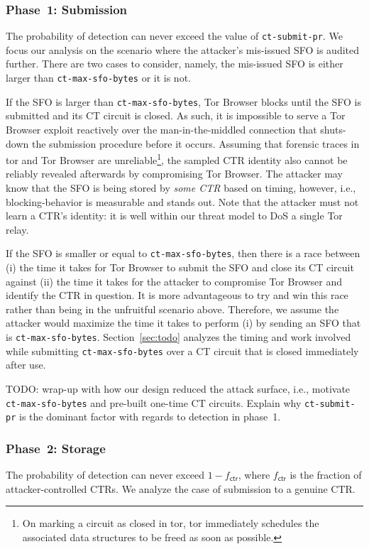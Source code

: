 \subsubsection{Phase~1: Submission} \label{sec:analysis:pr:phase1}
The probability of detection can never exceed the value of
\texttt{ct-submit-pr}.  We focus our analysis on the scenario where the
attacker's mis-issued SFO is audited further.  There are two cases to consider,
namely, the mis-issued SFO is either larger than \texttt{ct-max-sfo-bytes} or it
is not.

If the SFO is larger than \texttt{ct-max-sfo-bytes}, Tor Browser blocks until
the SFO is submitted and its CT circuit is closed.  As such, it is impossible to
serve a Tor Browser exploit reactively over the man-in-the-middled connection
that shuts-down the submission procedure before it occurs.  Assuming that
forensic traces in tor and Tor Browser are unreliable\footnote{On marking a
circuit as closed in tor, tor immediately schedules the associated data
structures to be freed as soon as possible.}, the sampled CTR identity also
cannot be reliably revealed afterwards by compromising Tor Browser.  The
attacker may know that the SFO is being stored by \emph{some CTR} based on
timing, however, i.e., blocking-behavior is measurable and stands out. Note that
the attacker must not learn a CTR's identity: it is well within our threat model
to DoS a single Tor relay.

If the SFO is smaller or equal to \texttt{ct-max-sfo-bytes}, then there is a
race between (i) the time it takes for Tor Browser to submit the SFO and close
its CT circuit against (ii) the time it takes for the attacker to compromise Tor
Browser and identify the CTR in question.  It is more advantageous to try and
win this race rather than being in the unfruitful scenario above.  Therefore, we
assume the attacker would maximize the time it takes to perform (i) by sending
an SFO that is \texttt{ct-max-sfo-bytes}.  Section~\ref{sec:todo} analyzes the
timing and work involved while submitting \texttt{ct-max-sfo-bytes} over a CT
circuit that is closed immediately after use.

TODO: wrap-up with how our design reduced the attack surface, i.e., motivate
\texttt{ct-max-sfo-bytes} and pre-built one-time CT circuits.  Explain
why \texttt{ct-submit-pr} is the dominant factor with regards to detection in
phase~1.

\subsubsection{Phase~2: Storage} \label{sec:analysis:pr:phase2}
The probability of detection can never exceed $1-f_{\mathsf{ctr}}$, where
$f_{\mathsf{ctr}}$ is the fraction of attacker-controlled CTRs.  We analyze
the case of submission to a genuine CTR.

